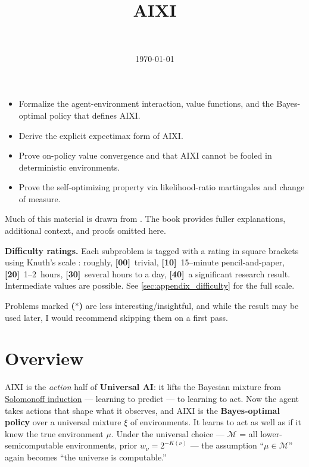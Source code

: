 \documentclass[fontsize=11pt, parskip=half]{scrartcl}
\newcommand{\cM}{\mathcal{M}}
\begin{document}
\title{AIXI}
\author{\\ }
\date{\today}
\maketitle

\begin{learningoutcomes}
  \begin{itemize}
    \item Formalize the agent-environment interaction, value functions, and the Bayes-optimal policy that defines AIXI.
    \item Derive the explicit expectimax form of AIXI.
    \item Prove on-policy value convergence and that AIXI cannot be fooled in deterministic environments.
    \item Prove the self-optimizing property via likelihood-ratio martingales and change of measure.
  \end{itemize}
\end{learningoutcomes}

\medskip
\noindent
Much of this material is drawn from \cite{Hutter:24uaibook2}. 
The book provides fuller explanations, additional context, and proofs omitted here.

\medskip
\noindent
\textbf{Difficulty ratings.} Each subproblem is tagged with a rating in square brackets using Knuth's scale \cite{Knuth:73a}: roughly, \textbf{[00]}~trivial, \textbf{[10]}~15--minute pencil-and-paper, \textbf{[20]}~1--2~hours, \textbf{[30]}~several hours to a day, \textbf{[40]}~a significant research result. Intermediate values are possible. See \cref{sec:appendix_difficulty} for the full scale. 

Problems marked \textbf{($\ast$)} are less interesting/insightful, and while the result may be used later, I would recommend skipping them on a first pass.


\section*{Overview}

AIXI is the \emph{action} half of \textbf{Universal AI}: it lifts the Bayesian
mixture from \href{/agency/solomonoff-induction}{Solomonoff induction} --- learning
to predict --- to learning to act. Now the agent takes actions that shape what it
observes, and AIXI is the \textbf{Bayes-optimal policy} over a universal mixture
$\xi$ of environments. It learns to act as well as if it knew the true environment
$\mu$. Under the universal choice --- $\cM$ = all lower-semicomputable environments,
prior $w_\nu = 2^{-K(\nu)}$ --- the assumption ``$\mu \in \cM$'' again becomes
``the universe is computable.''
\end{document}
